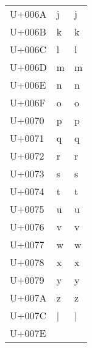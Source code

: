 \documentclass{article}
\begin{document}
\begin{longtable}{lll}
U+006A & j & j \\
U+006B & k & k \\
U+006C & l & l \\
U+006D & m & m \\
U+006E & n & n \\
U+006F & o & o \\
U+0070 & p & p \\
U+0071 & q & q \\
U+0072 & r & r \\
U+0073 & s & s \\
U+0074 & t & t \\
U+0075 & u & u \\
U+0076 & v & v \\
U+0077 & w & w \\
U+0078 & x & x \\
U+0079 & y & y \\
U+007A & z & z \\
U+007C & | & | \\
U+007E & ~ & ~ \\
\end{longtable}
\end{document}
